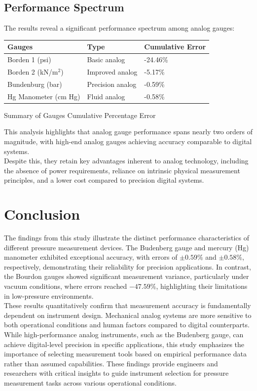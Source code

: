 \documentclass{article}
\begin{document}
\subsection{Performance Spectrum} 
The results reveal a significant performance spectrum among analog gauges:
\begin{center}
	\begin{tabular}{l l l}
		\toprule
		\textbf{Gauges} & \textbf{Type} & \textbf{Cumulative Error} \\
		\midrule
		Borden 1 (psi) & Basic analog & -24.46\% \\
		Borden 2 (kN/m$^2$) & Improved analog & -5.17\% \\
		Bundenburg (bar) & Precision analog & -0.59\% \\
		Hg Manometer (cm Hg) & Fluid analog & -0.58\% \\
		\bottomrule
	\end{tabular}
	\caption{Summary of Gauges Cumulative Percentage Error}
\end{center}
This analysis highlights that analog gauge performance spans nearly two orders of magnitude, with high-end analog gauges achieving accuracy comparable to digital systems.\\[8pt]
Despite this, they retain key advantages inherent to analog technology, including the absence of power requirements, reliance on intrinsic physical measurement principles, and a lower cost compared to precision digital systems.

\newpage


\section{Conclusion}
The findings from this study illustrate the distinct performance characteristics of different pressure measurement devices. The Budenberg gauge and mercury (Hg) manometer exhibited exceptional accuracy, with errors of $\pm 0.59\%$ and $\pm 0.58\%$, respectively, demonstrating their reliability for precision applications. In contrast, the Bourdon gauges showed significant measurement variance, particularly under vacuum conditions, where errors reached $-47.59\%$, highlighting their limitations in low-pressure environments.\\[8pt]
These results quantitatively confirm that measurement accuracy is fundamentally dependent on instrument design. Mechanical analog systems are more sensitive to both operational conditions and human factors compared to digital counterparts. While high-performance analog instruments, such as the Budenberg gauge, can achieve digital-level precision in specific applications, this study emphasizes the importance of selecting measurement tools based on empirical performance data rather than assumed capabilities. These findings provide engineers and researchers with critical insights to guide instrument selection for pressure measurement tasks across various operational conditions.
\newpage
\end{document}
